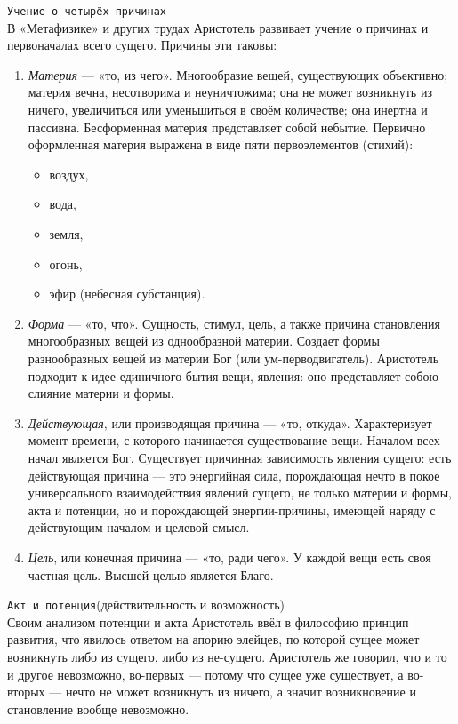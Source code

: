 \documentclass[12pt]{article}
\begin{document}
\texttt{Учение о четырёх причинах}\\
В «Метафизике» и других трудах Аристотель развивает учение о причинах и первоначалах всего сущего. Причины эти таковы:
\begin{enumerate}
\item \textit{Материя} — «то, из чего».
	Многообразие вещей, существующих объективно; материя вечна, несотворима и неуничтожима;
	она не может возникнуть из ничего, увеличиться или уменьшиться в своём количестве; она инертна и пассивна.
	Бесформенная материя представляет собой небытие.
	Первично оформленная материя выражена в виде пяти первоэлементов (стихий):
	\begin{itemize}
	\item воздух,
	\item вода,
	\item земля,
	\item огонь,
	\item эфир (небесная субстанция).
	\end{itemize}
\item \textit{Форма} — «то, что».
	Сущность, стимул, цель, а также причина становления многообразных вещей из однообразной материи.
	Создает формы разнообразных вещей из материи Бог (или ум-перводвигатель).
	Аристотель подходит к идее единичного бытия вещи, явления: оно представляет собою слияние материи и формы.
\item \textit{Действующая}, или производящая причина — «то, откуда».
	Характеризует момент времени, с которого начинается существование вещи.
	Началом всех начал является Бог.
	Существует причинная зависимость явления сущего: есть действующая причина — это энергийная сила,
	порождающая нечто в покое универсального взаимодействия явлений сущего, не только материи и формы,
	акта и потенции, но и порождающей энергии-причины, имеющей наряду с действующим началом и целевой смысл.
\item \textit{Цель}, или конечная причина — «то, ради чего».
	У каждой вещи есть своя частная цель. Высшей целью является Благо.
\end{enumerate}

\texttt{Акт и потенция}(действительность и возможность)\\
Своим анализом потенции и акта Аристотель ввёл в философию принцип развития, что явилось ответом на апорию элейцев,
по которой сущее может возникнуть либо из сущего, либо из не-сущего.
Аристотель же говорил, что и то и другое невозможно, во-первых — потому что сущее уже существует,
а во-вторых — нечто не может возникнуть из ничего, а значит возникновение и становление вообще невозможно.
\end{document}
